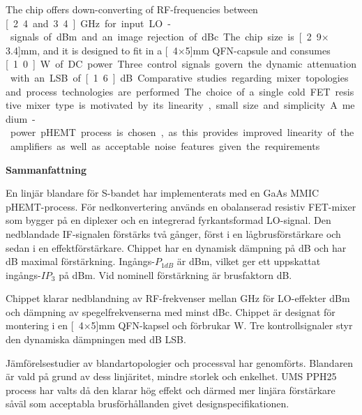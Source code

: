 	The chip offers down-converting of RF-frequencies between \unit[2.4 and 3.4]{GHz} for input LO-signals of \unit[-4--0]{dBm} and an image rejection of \unit[40]{dBc}. The chip size is \unit[2.9$\times$3.4]{mm}, and it is designed to fit in a \unit[4$\times$5]{mm} QFN-capsule and consumes \unit[1.0]{W} of DC power. Three control signals govern the dynamic attenuation with an LSB of \unit[1.6]{dB}.
	
	Comparative studies regarding mixer topologies and process technologies are performed. The choice of a single cold FET resistive mixer type is motivated by its linearity, small size and simplicity. A medium-power pHEMT process is chosen, as this provides improved linearity of the amplifiers as well as acceptable noise features given the requirements.

{}
\vspace{1.5cm}
\begin{center}
{\bf Sammanfattning} \\[0.4cm]
\end{center}
	En linjär blandare för S-bandet har implementerats med en \unit[0,25]{\mum} GaAs MMIC pHEMT-process. För nedkonvertering används en obalanserad resistiv FET-mixer som bygger på en diplexer och en integrerad fyrkantsformad LO-signal. Den nedblandade IF-signalen förstärks två gånger, först i en lågbrusförstärkare och sedan i en effektförstärkare. Chippet har en dynamisk dämpning på \unit[10,5]{dB} och har \unit[15]{dB} maximal förstärkning. Ingångs-$P_{1dB}$ är \unit[10]{dBm}, vilket ger ett uppskattat ingångs-$IP_3$ på \unit[20]{dBm}. Vid nominell förstärkning är brusfaktorn \unit[11]{dB}.
	
Chippet klarar nedblandning av RF-frekvenser mellan \unit[2,9 och 3,4]{GHz} för LO-effekter \unit[-4--0]{dBm} och dämpning av spegelfrekvenserna med minst \unit[40]{dBc}. Chippet är designat för montering i en \unit[4$\times$5]{mm} QFN-kapsel och förbrukar \unit[1,0]{W}. Tre kontrollsignaler styr den dynamiska dämpningen med \unit[1,6]{dB} LSB.

Jämförelsestudier av blandartopologier och processval har genomförts. Blandaren är vald på grund av dess linjäritet, mindre storlek och enkelhet. UMS PPH25 process har valts då den klarar hög effekt och därmed mer linjära förstärkare såväl som acceptabla brusförhållanden givet design\-specifikationen.

